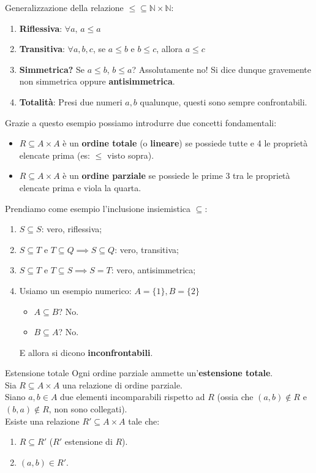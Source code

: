 \documentclass[12pt]{report}
\newcommand{\N}{\mathbb{N}}
\begin{document}
	Generalizzazione della relazione $\le \subseteq \N \times \N$:
	\begin{enumerate}
		\item \textbf{Riflessiva}: $\forall a, \, a \le a$
		\item \textbf{Transitiva}: $\forall a, b, c$, se $a \le b$ e $b \le c$, allora $a \le c$
		\item \textbf{Simmetrica?} Se $a \le b$, $b \le a$? Assolutamente no! Si dice dunque gravemente non simmetrica oppure \textbf{antisimmetrica}.
		\item \textbf{Totalità}: Presi due numeri $a, b$ qualunque, questi sono sempre confrontabili.
	\end{enumerate}
	
	Grazie a questo esempio possiamo introdurre due concetti fondamentali:
	\begin{itemize}
		\item $R \subseteq A \times A$ è un \textbf{ordine totale} (o \textbf{lineare}) se possiede tutte e 4 le proprietà elencate prima (es: $\le$ visto sopra).
		\item $R \subseteq A \times A$ è un \textbf{ordine parziale} se possiede le prime 3 tra le proprietà elencate prima e viola la quarta.
	\end{itemize}
	
	\begin{osservazione}{}{}
		Prendiamo come esempio l'inclusione insiemistica $\subseteq$:
		\begin{enumerate}
			\item $S \subseteq S$: vero, riflessiva;
			\item $S \subseteq T$ e $T \subseteq Q \implies S \subseteq Q$: vero, transitiva;
			\item $S \subseteq T$ e $T \subseteq S \implies S = T$: vero, antisimmetrica;
			\item Usiamo un esempio numerico: $A = \{1\}, B = \{2\}$
			\begin{itemize}
				\item $A \subseteq B$? No.
				\item $B \subseteq A$? No.
			\end{itemize}
			E allora si dicono \textbf{inconfrontabili}.
		\end{enumerate}
	\end{osservazione}
	
	\begin{teorema}{Estensione totale}{}
		Ogni ordine parziale ammette un'\textbf{estensione totale}.\\
		Sia $R \subseteq A \times A$ una relazione di ordine parziale.\\
		Siano $a, b \in A$ due elementi incomparabili rispetto ad $R$ (ossia che $(a, b) \notin R$ e $(b, a) \notin R$, non sono collegati).\\
		Esiste una relazione $R' \subseteq A \times A$ tale che:
		\begin{enumerate}
			\item $R \subseteq R'$ ($R'$ estensione di $R$).
			\item $(a, b) \in R'$.
		\end{enumerate}
	\end{teorema}
	
\end{document}

